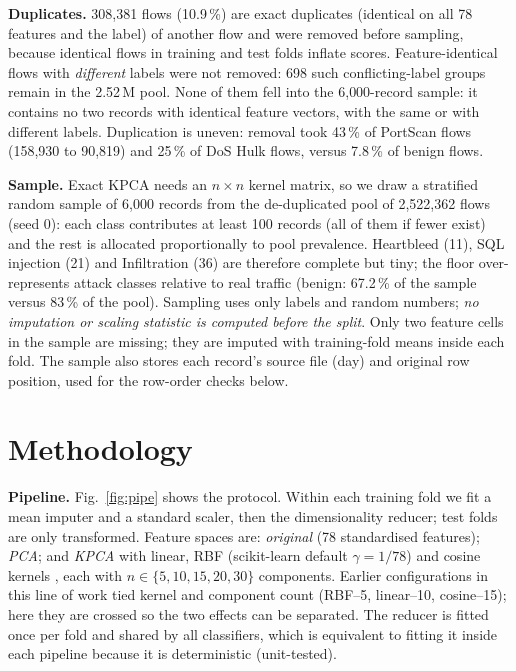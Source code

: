 \documentclass[conference,a4paper]{IEEEtran}
\newcommand{\tabsize}{\footnotesize}
\begin{document}
\textbf{Duplicates.} 308{,}381 flows (10.9\,\%) are exact duplicates (identical on all 78 features and the label) of another flow and were removed before sampling, because identical flows in training and test folds inflate scores. Feature-identical flows with \emph{different} labels were not removed: 698 such conflicting-label groups remain in the 2.52\,M pool. None of them fell into the 6{,}000-record sample: it contains no two records with identical feature vectors, with the same or with different labels. Duplication is uneven: removal took 43\,\% of PortScan flows (158{,}930 to 90{,}819) and 25\,\% of DoS Hulk flows, versus 7.8\,\% of benign flows.

\textbf{Sample.} Exact KPCA needs an $n\times n$ kernel matrix, so we draw a stratified random sample of 6{,}000 records from the de-duplicated pool of 2{,}522{,}362 flows (seed 0): each class contributes at least 100 records (all of them if fewer exist) and the rest is allocated proportionally to pool prevalence. Heartbleed (11), SQL injection (21) and Infiltration (36) are therefore complete but tiny; the floor over-represents attack classes relative to real traffic (benign: 67.2\,\% of the sample versus 83\,\% of the pool). Sampling uses only labels and random numbers; \emph{no imputation or scaling statistic is computed before the split}. Only two feature cells in the sample are missing; they are imputed with training-fold means inside each fold. The sample also stores each record's source file (day) and original row position, used for the row-order checks below.

\begin{table}[t]
\caption{Class distribution of the 6{,}000-record sample.}\label{tab:classes}
\centering\tabsize

\end{table}

\section{Methodology}\label{sec:method}
\textbf{Pipeline.} Fig.~\ref{fig:pipe} shows the protocol. Within each training fold we fit a mean imputer and a standard scaler, then the dimensionality reducer; test folds are only transformed. Feature spaces are: \emph{original} (78 standardised features); \emph{PCA}; and \emph{KPCA} with linear, RBF (scikit-learn default $\gamma=1/78$) and cosine kernels \cite{scholkopf1998}, each with $n\in\{5,10,15,20,30\}$ components. Earlier configurations in this line of work tied kernel and component count (RBF--5, linear--10, cosine--15); here they are crossed so the two effects can be separated. The reducer is fitted once per fold and shared by all classifiers, which is equivalent to fitting it inside each pipeline because it is deterministic (unit-tested).
\end{document}

